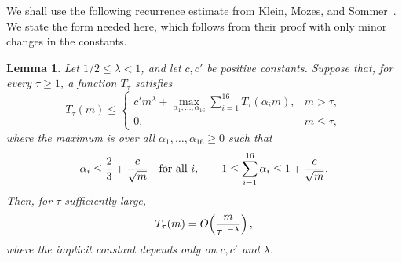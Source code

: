 \documentclass[11pt]{article}
\theoremstyle{plain}
\newtheorem{lemma}[theorem]{Lemma}
\theoremstyle{definition}
\theoremstyle{remark}
\begin{document}
We shall use the following recurrence estimate from Klein, Mozes, and Sommer~\cite[Section~2.7]{KMS13}. We state the form needed here, which follows from their proof with only minor changes in the constants.

\begin{lemma}\label{lem:kms-recurrence}
Let \(1/2\le \lambda<1\), and let \(c,c'\) be positive constants. Suppose that, for every \(\tau\ge 1\), a function \(T_\tau\) satisfies
\[
T_\tau(m)\le
\begin{cases}
c' m^\lambda+\displaystyle\max_{\alpha_1,\ldots,\alpha_{16}}
       \sum_{i=1}^{16} T_\tau(\alpha_i m),& m>\tau,\\[1ex]
0,&m\le \tau,
\end{cases}
\]
where the maximum is over all \(\alpha_1,\ldots,\alpha_{16}\ge 0\) such that
\[
\alpha_i\le {2\over 3}+{c\over \sqrt m}\quad\text{for all }i,
\qquad
1\le \sum_{i=1}^{16}\alpha_i\le 1+{c\over \sqrt m}.
\]
Then, for \(\tau\) sufficiently large,
\[
T_\tau(m)=O\!\left({m\over \tau^{1-\lambda}}\right),
\]
where the implicit constant depends only on \(c,c'\) and \(\lambda\).
\end{lemma}
\end{document}
